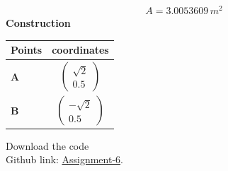 \documentclass[10pt,a4paper]{report}
\newcommand{\myvec}[1]{\ensuremath{\begin{pmatrix}#1\end{pmatrix}}}
\let\vec\mathbf
\let\vec\mathbf
\begin{document}
\begin{multicols}{2}
\begin{align}
    A= 3.0053609 \,m^2
\end{align}
 \vspace{2mm} \textbf{Construction}
\begin{center}
\setlength{\arrayrulewidth}{0.5mm}
\setlength{\tabcolsep}{6pt}
\renewcommand{\arraystretch}{1.5}
    \begin{tabular}{|l|c|}
    \hline 
    \textbf{Points} & \textbf{coordinates} \\ \hline
   $\vec{A}$ & $\myvec{
   \sqrt{2}\\
   0.5
   } $ \\\hline
   $\vec{B}$ & $\myvec{
   -\sqrt{2}\\
   0.5
   } $ \\\hline
      \end{tabular}
  \end{center}

\raggedright  Download the code \\
Github link: \href{https://github.com/chiragshah1244/FWC/blob/main/assignments/assignment_6/code_conic/conic.py}{Assignment-6}.
  \end{multicols}
\end{document}
